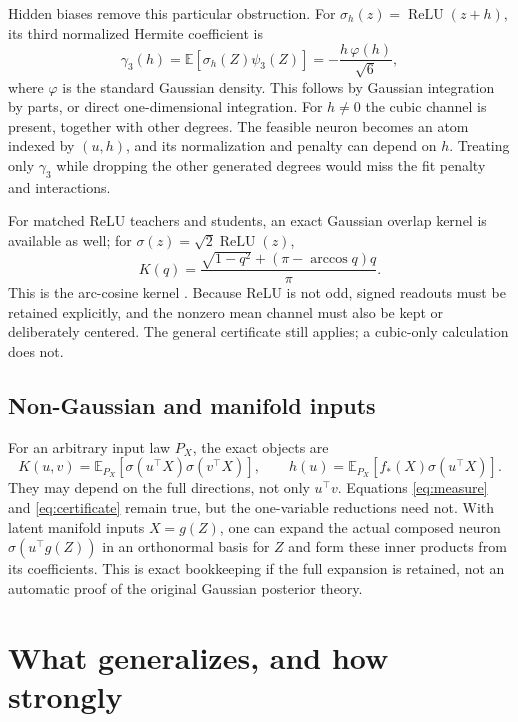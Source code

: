\documentclass[11pt]{article}
\newcommand{\E}{\mathbb E}
\theoremstyle{remark}
\begin{document}
Hidden biases remove this particular obstruction. For
$\sigma_h(z)=\operatorname{ReLU}(z+h)$, its third normalized Hermite
coefficient is
\begin{equation}
 \gamma_3(h)=\E[\sigma_h(Z)\psi_3(Z)]
       =-\frac{h\,\varphi(h)}{\sqrt6},
\end{equation}
where $\varphi$ is the standard Gaussian density. This follows by Gaussian
integration by parts, or direct one-dimensional integration. For $h\ne0$
the cubic channel is present, together with other degrees. The feasible
neuron becomes an atom indexed by $(u,h)$, and its normalization and penalty
can depend on $h$. Treating only $\gamma_3$ while dropping the other
generated degrees would miss the fit penalty and interactions.

For matched ReLU teachers and students, an exact Gaussian overlap kernel
is available as well; for $\sigma(z)=\sqrt2\operatorname{ReLU}(z)$,
\begin{equation}
 K(q)=\frac{\sqrt{1-q^2}+(\pi-\arccos q)q}{\pi}.
\end{equation}
This is the arc-cosine kernel \cite{cho}. Because ReLU is not odd, signed
readouts must be retained explicitly, and the nonzero mean channel must
also be kept or deliberately centered. The general certificate still
applies; a cubic-only calculation does not.

\subsection{Non-Gaussian and manifold inputs}
For an arbitrary input law $P_X$, the exact objects are
\begin{equation}
 K(u,v)=\E_{P_X}[\sigma(u^\top X)\sigma(v^\top X)],\qquad
 h(u)=\E_{P_X}[f_*(X)\sigma(u^\top X)].
\end{equation}
They may depend on the full directions, not only $u^\top v$.
Equations \eqref{eq:measure} and \eqref{eq:certificate} remain true, but the
one-variable reductions need not. With latent manifold inputs $X=g(Z)$,
one can expand the actual composed neuron $\sigma(u^\top g(Z))$ in an
orthonormal basis for $Z$ and form these inner products from its coefficients.
This is exact bookkeeping if the full expansion is retained, not an
automatic proof of the original Gaussian posterior theory.

\section{What generalizes, and how strongly}
\end{document}
